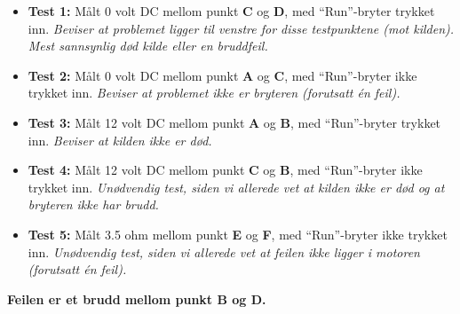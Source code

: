 \begin{itemize}
\item{} {\bf Test 1:} Målt 0 volt DC mellom punkt {\bf C} og {\bf D}, med ``Run''-bryter trykket inn.  {\it Beviser at problemet ligger til venstre for disse testpunktene (mot kilden).  Mest sannsynlig død kilde eller en bruddfeil.}
\vskip 5pt
\item{} {\bf Test 2:} Målt 0 volt DC mellom punkt {\bf A} og {\bf C}, med ``Run''-bryter ikke trykket inn.  {\it Beviser at problemet ikke er bryteren (forutsatt én feil).}
\vskip 5pt
\item{} {\bf Test 3:} Målt 12 volt DC mellom punkt {\bf A} og {\bf B}, med ``Run''-bryter trykket inn.  {\it Beviser at kilden ikke er død.}
\vskip 5pt
\item{} {\bf Test 4:} Målt 12 volt DC mellom punkt {\bf C} og {\bf B}, med ``Run''-bryter ikke trykket inn.  {\it Unødvendig test, siden vi allerede vet at kilden ikke er død og at bryteren ikke har brudd.}
\vskip 5pt
\item{} {\bf Test 5:} Målt 3.5 ohm mellom punkt {\bf E} og {\bf F}, med ``Run''-bryter ikke trykket inn.  {\it Unødvendig test, siden vi allerede vet at feilen ikke ligger i motoren (forutsatt én feil).}
\end{itemize}

\vskip 10pt

{\bf Feilen er et brudd mellom punkt B og D.}











